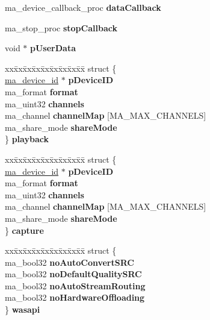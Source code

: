 \begin{DoxyCompactItemize}
ma\+\_\+device\+\_\+callback\+\_\+proc {\bfseries data\+Callback}
\item 
\mbox{\label{structma__device__config_aa63a1fad8d16b162a01c502d0e755488}} 
ma\+\_\+stop\+\_\+proc {\bfseries stop\+Callback}
\item 
\mbox{\label{structma__device__config_a4c8e35691e3c777e6033c8d9e0dc8ed7}} 
void $\ast$ {\bfseries p\+User\+Data}
\item 
\mbox{\label{structma__device__config_ae216bf0561e128c222417fd5e54d4105}} 
\begin{tabbing}
xx\=xx\=xx\=xx\=xx\=xx\=xx\=xx\=xx\=\kill
struct \{\\
\>\mbox{\hyperlink{unionma__device__id}{ma\_device\_id}} $\ast$ {\bfseries pDeviceID}\\
\>ma\_format {\bfseries format}\\
\>ma\_uint32 {\bfseries channels}\\
\>ma\_channel {\bfseries channelMap} \mbox{[}MA\_MAX\_CHANNELS\mbox{]}\\
\>ma\_share\_mode {\bfseries shareMode}\\
\} {\bfseries playback}\\

\end{tabbing}\item 
\mbox{\label{structma__device__config_ab07399dfcacb0cf849e96a492b54f8ab}} 
\begin{tabbing}
xx\=xx\=xx\=xx\=xx\=xx\=xx\=xx\=xx\=\kill
struct \{\\
\>\mbox{\hyperlink{unionma__device__id}{ma\_device\_id}} $\ast$ {\bfseries pDeviceID}\\
\>ma\_format {\bfseries format}\\
\>ma\_uint32 {\bfseries channels}\\
\>ma\_channel {\bfseries channelMap} \mbox{[}MA\_MAX\_CHANNELS\mbox{]}\\
\>ma\_share\_mode {\bfseries shareMode}\\
\} {\bfseries capture}\\

\end{tabbing}\item 
\mbox{\label{structma__device__config_a064978b4a7152a136d8e269f27785108}} 
\begin{tabbing}
xx\=xx\=xx\=xx\=xx\=xx\=xx\=xx\=xx\=\kill
struct \{\\
\>ma\_bool32 {\bfseries noAutoConvertSRC}\\
\>ma\_bool32 {\bfseries noDefaultQualitySRC}\\
\>ma\_bool32 {\bfseries noAutoStreamRouting}\\
\>ma\_bool32 {\bfseries noHardwareOffloading}\\
\} {\bfseries wasapi}\\


\end{tabbing}
\end{DoxyCompactItemize}
